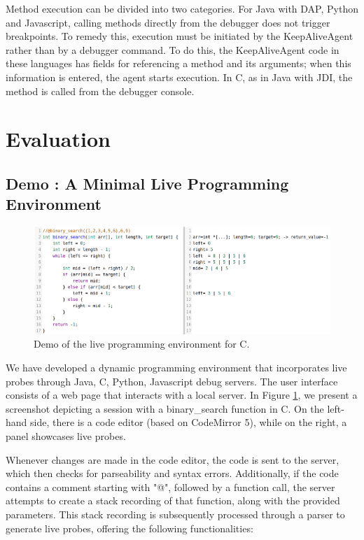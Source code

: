 \documentclass[english,submission]{programming}
\begin{document}
Method execution can be divided into two categories.
For Java with DAP, Python and Javascript, calling methods directly from the debugger does not trigger breakpoints. To remedy this, execution must be initiated by the KeepAliveAgent rather than by a debugger command. 
To do this, the KeepAliveAgent code in these languages has fields for referencing a method and its arguments; when this information is entered, the agent starts execution.
In C, as in Java with JDI, the method is called from the debugger console.

\section{Evaluation}
\label{sec:evaluation}
\subsection{Demo : A Minimal Live Programming Environment}
\label{sec:demo-small-c}
\begin{figure}[htbp]
  \centering
  \includegraphics[width=\linewidth]{img/demo/c.png}
  \caption{Demo of the live programming environment for C.}
  \label{fig:demo}
\end{figure}

We have developed a dynamic programming environment that incorporates live probes through Java, C, Python, Javascript debug servers. 
The user interface consists of a web page that interacts with a local server. 
In Figure \ref{fig:demo}, we present a screenshot depicting a session with a binary\_search function in C. 
On the left-hand side, there is a code editor (based on CodeMirror 5), while on the right, a panel showcases live probes.

Whenever changes are made in the code editor, the code is sent to the server, which then checks for parseability and syntax errors. 
Additionally, if the code contains a comment starting with "@", followed by a function call, the server attempts to create a stack recording of that function, along with the provided parameters. 
This stack recording is subsequently processed through a parser to generate live probes, offering the following functionalities:
\end{document}
